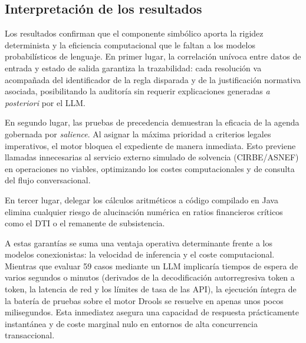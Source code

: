 \documentclass[12pt,a4paper]{report}
\begin{document}
\begin{table}[htbp]
\centering
{}
\caption{Resumen cuantitativo de métricas del motor simbólico.}
\label{tab:drools_metrics}
\end{table}

\subsection{Interpretación de los resultados}

Los resultados confirman que el componente simbólico aporta la rigidez determinista y la eficiencia computacional que le faltan a los modelos probabilísticos de lenguaje. En primer lugar, la correlación unívoca entre datos de entrada y estado de salida garantiza la trazabilidad: cada resolución va acompañada del identificador de la regla disparada y de la justificación normativa asociada, posibilitando la auditoría sin requerir explicaciones generadas \textit{a posteriori} por el LLM.

En segundo lugar, las pruebas de precedencia demuestran la eficacia de la agenda gobernada por \textit{salience}. Al asignar la máxima prioridad a criterios legales imperativos, el motor bloquea el expediente de manera inmediata. Esto previene llamadas innecesarias al servicio externo simulado de solvencia (CIRBE/ASNEF) en operaciones no viables, optimizando los costes computacionales y de consulta del flujo conversacional.

En tercer lugar, delegar los cálculos aritméticos a código compilado en Java elimina cualquier riesgo de alucinación numérica en ratios financieros críticos como el DTI o el remanente de subsistencia. 

A estas garantías se suma una ventaja operativa determinante frente a los modelos conexionistas: la velocidad de inferencia y el coste computacional. Mientras que evaluar 59 casos mediante un LLM implicaría tiempos de espera de varios segundos o minutos (derivados de la decodificación autorregresiva token a token, la latencia de red y los límites de tasa de las API), la ejecución íntegra de la batería de pruebas sobre el motor Drools se resuelve en apenas unos pocos milisegundos. Esta inmediatez asegura una capacidad de respuesta prácticamente instantánea y de coste marginal nulo en entornos de alta concurrencia transaccional.
\end{document}
